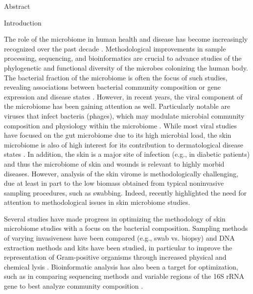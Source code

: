 \documentclass[oneside,12pt,final]{sty/ucthesis-CA2012}
\begin{document}
\begin{mainmatter}
\begin{section}{Abstract}
\end{section}

\begin{section}{Introduction}

The role of the microbiome in human health and disease has become increasingly recognized over the past decade \cite{RN52}. Methodological improvements in sample processing, sequencing, and bioinformatics are crucial to advance studies of the phylogenetic and functional diversity of the microbes colonizing the human body. The bacterial fraction of the microbiome is often the focus of such studies, revealing associations between bacterial community composition or gene expression and disease states \cite{RN53}. However, in recent years, the viral component of the microbiome has been gaining attention as well. Particularly notable are viruses that infect bacteria (phages), which may modulate microbial community composition and physiology within the microbiome \cite{RN166, RN56, RN55}. While most viral studies have focused on the gut microbiome due to its high microbial load, the skin microbiome is also of high interest for its contribution to dermatological disease states \cite{RN55, RN56}. In addition, the skin is a major site of infection (e.g., in diabetic patients) and thus the microbiome of skin and wounds is relevant to highly morbid diseases. However, analysis of the skin virome is methodologically challenging, due at least in part to the low biomass obtained from typical noninvasive sampling procedures, such as swabbing. Indeed, \cite{RN57} recently highlighted the need for attention to methodological issues in skin microbiome studies.

Several studies have made progress in optimizing the methodology of skin microbiome studies with a focus on the bacterial composition. Sampling methods of varying invasiveness have been compared (e.g., swab vs. biopsy) \cite{RN58, RN59} and DNA extraction methods and kits have been studied, in particular to improve the representation of Gram-positive organisms through increased physical and chemical lysis \cite{RN60, RN61, RN62}. Bioinformatic analysis has also been a target for optimization, such as in comparing sequencing methods \cite{RN60} and variable regions of the 16S rRNA gene to best analyze community composition \cite{RN170, RN171}.


\end{section}
\end{mainmatter}
\end{document}
